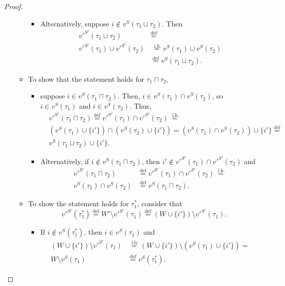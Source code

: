 \documentclass{article}
\newcommand{\lcup}{\sqcup}
\newcommand{\lcap}{\sqcap}
\newcommand{\lstar}{^*}
\newcommand{\eqdef}{\stackrel{\text{def}}{=}}
\newcommand{\eqih}{\stackrel{\text{ i.h.}}{=}}
\begin{document}
\begin{proof}
\begin{itemize}
\begin{itemize}
\begin{itemize}
      \item Alternatively, suppose $i \not \in v^S(\tau_1 \lcup \tau_2)$. Then
        \begin{align*}
          v'^{S'}(\tau_1 \lcup \tau_2) &\eqdef \\
          v'^{S'}(\tau_1) \cup v'^{S'}(\tau_2) &\eqih v^S(\tau_1) \cup v^S(\tau_2) \\
          &\eqdef v^S(\tau_1 \lcup \tau_2).
        \end{align*}
      \end{itemize}

    \item To show that the statement holds for $\tau_1 \lcap \tau_2$,
      \begin{itemize}
      \item suppose $i \in v^S(\tau_1 \lcap \tau_2)$. Then, $i \in v^S(\tau_1) \cap v^S(\tau_2)$, so $i \in v^S(\tau_1)$ and $i \in v^S(\tau_2)$. Thus,
        \begin{align*}
          &v'^{S'}(\tau_1 \lcap \tau_2) \eqdef v'^{S'}(\tau_1) \cap v'^{S'}(\tau_2) \eqih \\
          &(v^S(\tau_1) \cup \{i'\}) \cap (v^S(\tau_2) \cup \{i'\}) = (v^S(\tau_1) \cap v^S(\tau_2)) \cup \{i'\} \eqdef \\
          &v^S(\tau_1 \lcup \tau_2) \cup \{i'\}.
        \end{align*}

      \item Alternatively, if $i \not \in v^S(\tau_1 \lcap \tau_2)$, then $i' \not \in v'^{S'}(\tau_1) \cap v'^{S'}(\tau_2)$ and
        \begin{align*}
          v'^{S'}(\tau_1 \lcap \tau_2) &\eqdef v'^{S'}(\tau_1) \cap v'^{S'}(\tau_2) \eqih \\
          v^S(\tau_1) \cap v^S(\tau_2) &\eqdef v^S(\tau_1 \lcap \tau_2).
        \end{align*}
      \end{itemize}


    \item To show the statement holds for $\tau_1\lstar$, consider that
      \begin{equation*}
        v'^{S'}(\tau_1\lstar) \eqdef W' \setminus v'^{S'}(\tau_1) \eqdef (W \cup \{i'\}) \setminus v'^{S'}(\tau_1).
      \end{equation*}
      \begin{itemize}
      \item If $i \not \in v^S(\tau_1\lstar)$, then $i \in v^S(\tau_1)$ and
        \begin{align*}
          (W \cup \{i'\}) \setminus v'^{S'}(\tau_1) &\eqih (W \cup \{i'\}) \setminus (v^S(\tau_1) \cup \{i'\}) = \\
          W \setminus v^S(\tau_1) &\eqdef v^S(\tau_1\lstar).
        \end{align*}


\end{itemize}
\end{itemize}
\end{itemize}
\end{proof}
\end{document}
